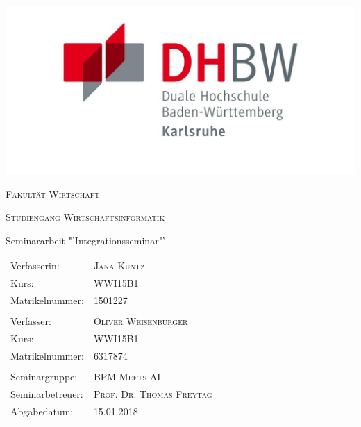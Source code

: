 \begin{titlepage}
	\centering
	
	\includegraphics{pictures/dhbw_logo.png}
	\vspace{1cm}
	\par
	{\scshape\LARGE Fakultät Wirtschaft\par}
	\vspace{0.2cm}
	{\scshape\Large Studiengang Wirtschaftsinformatik\par}
	\vspace{1cm}
	{\Large Seminararbeit "'Integrationsseminar"'\par}
	\vspace{1cm}
	
{\large\bfseries \ThesisTitle \par}
	\vfill
	
	\begin{center}
	\begin{tabularx}{\columnwidth}{XXl}
	Verfasserin: &  \textsc{Jana Kuntz}\\
	Kurs: & \textsc{WWI15B1} \\
	Matrikelnummer: & \textsc{1501227} \\\\
	Verfasser: & \textsc{Oliver Weisenburger} \\
	Kurs: & \textsc{WWI15B1} \\
	Matrikelnummer: & \textsc{6317874} \\\\
	Seminargruppe:&  \textsc{BPM Meets AI} 	 \\
	Seminarbetreuer: &  \textsc{Prof. Dr. Thomas Freytag} 	\\
	
	Abgabedatum: & \textsc{15.01.2018} \\
\end{tabularx} 
 \end{center}

\end{titlepage}
